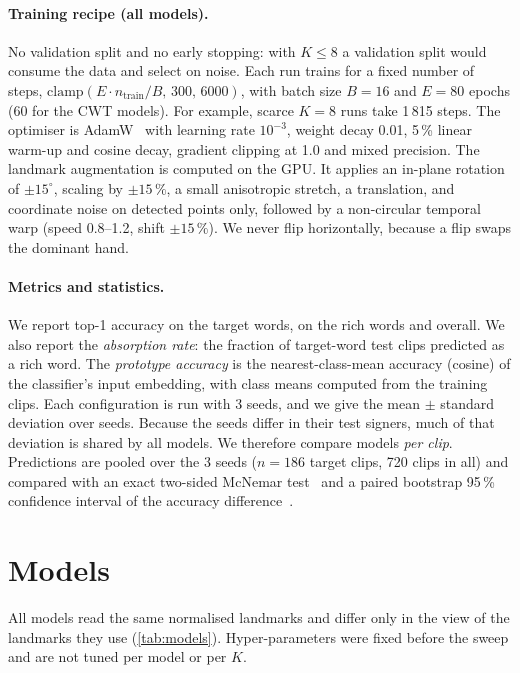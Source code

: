 \documentclass[11pt]{article}
\begin{document}
\paragraph{Training recipe (all models).}
No validation split and no early stopping: with $K\le8$ a validation split would consume the
data and select on noise. Each run trains for a fixed number of steps,
$\mathrm{clamp}(E\cdot n_\text{train}/B,\,300,\,6000)$, with batch size $B{=}16$ and $E{=}80$
epochs (60 for the CWT models). For example, scarce $K{=}8$ runs take 1\,815 steps. The
optimiser is AdamW~\citep{loshchilov2019adamw} with learning rate $10^{-3}$, weight decay
0.01, 5\,\% linear warm-up and cosine decay, gradient clipping at 1.0 and mixed precision. The
landmark augmentation is computed on the GPU. It applies an in-plane rotation of
$\pm15^\circ$, scaling by $\pm15\,\%$, a small anisotropic stretch, a translation, and
coordinate noise on detected points only, followed by a non-circular temporal warp
(speed 0.8--1.2, shift $\pm15\,\%$). We never flip horizontally, because a flip swaps the
dominant hand.

\paragraph{Metrics and statistics.}
We report top-1 accuracy on the target words, on the rich words and overall. We also report
the \emph{absorption rate}: the fraction of target-word test clips predicted as a rich word.
The \emph{prototype accuracy} is the nearest-class-mean accuracy (cosine) of the
classifier's input embedding, with class means computed from the training clips. Each
configuration is run with 3 seeds, and we give the mean $\pm$ standard deviation over seeds.
Because the seeds differ in their test signers, much of that deviation is shared by all
models. We therefore compare models \emph{per clip}. Predictions are pooled over the 3 seeds
($n{=}186$ target clips, 720 clips in all) and compared with an exact two-sided McNemar
test~\citep{mcnemar1947,dietterich1998tests} and a paired bootstrap 95\,\% confidence
interval of the accuracy difference~\citep{efron1993bootstrap}.

\section{Models}\label{sec:models}

All models read the same normalised landmarks and differ only in the view of the landmarks
they use (\cref{tab:models}). Hyper-parameters were fixed before the sweep and are not tuned
per model or per $K$.
\end{document}
